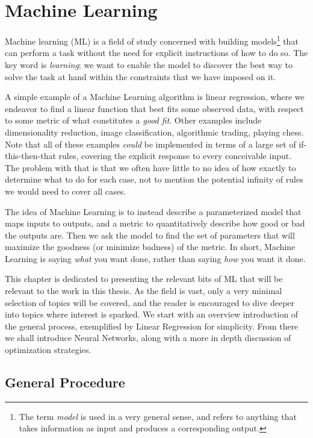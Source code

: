 \documentclass[Thesis.tex]{subfiles}
\begin{document}
\chapter{Machine Learning}
\label{chp:machine-learning}

Machine learning (ML) is a field of study concerned with building
models\footnote{The term \emph{model} is used in a very general sense, and
refers to anything that takes information as input and produces a corresponding
output.} that can perform a task without the need for explicit instructions of
how to do so. The key word is \emph{learning}; we want to enable the model to
discover the best way to solve the task at hand within the constraints that we
have imposed on it.

A simple example of a Machine Learning algorithm is linear regression, where we endeavor to
find a linear function that best fits some observed data, with respect to some
metric of what constitutes a \emph{good fit}. Other examples include
dimensionality reduction, image classification, algorithmic trading, playing
chess. Note that all of these examples \emph{could} be implemented in terms of a
large set of if-this-then-that rules, covering the explicit response to every
conceivable input. The problem with that is that we often have little to no idea
of how exactly to determine what to do for each case, not to mention the
potential infinity of rules we would need to cover all cases.

The idea of Machine Learning is to instead describe a parameterized model that
maps inputs to outputs, and a metric to quantitatively describe how good or bad
the outputs are. Then we ask the model to find the set of parameters that will
maximize the goodness (or minimize badness) of the metric. In short, Machine
Learning is saying \emph{what} you want done, rather than saying \emph{how} you
want it done.

This chapter is dedicated to presenting the relevant bits of ML that will be
relevant to the work in this thesis. As the field is vast, only a very minimal
selection of topics will be covered, and the reader is encouraged to dive deeper
into topics where interest is sparked. We start with an overview introduction of
the general process, exemplified by Linear Regression for simplicity. From there
we shall introduce Neural Networks, along with a more in depth discussion of
optimization strategies.



\section{General Procedure}
\end{document}
